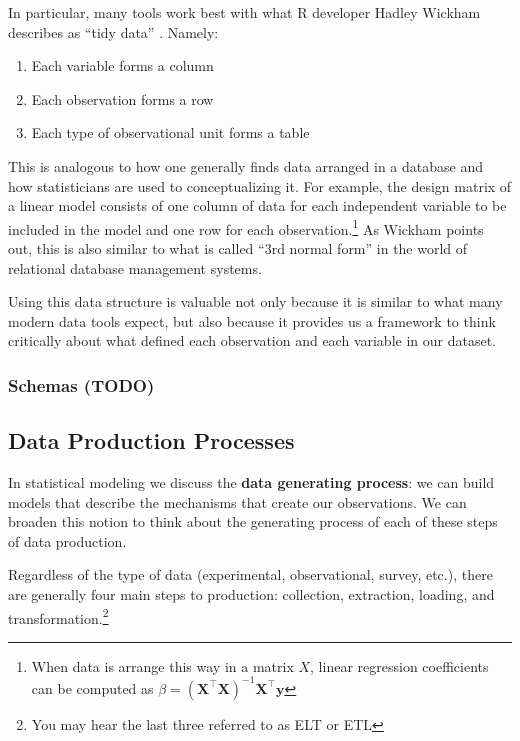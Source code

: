 \documentclass[
]{krantz}
\providecommand{\tightlist}{%
  \setlength{\itemsep}{0pt}\setlength{\parskip}{0pt}}
\begin{document}
In particular, many tools work best with what R developer Hadley Wickham describes as ``tidy data'' \citep{wickham_tidy}. Namely:

\begin{enumerate}
\def\labelenumi{\arabic{enumi}.}
\tightlist
\item
  Each variable forms a column
\item
  Each observation forms a row
\item
  Each type of observational unit forms a table
\end{enumerate}

This is analogous to how one generally finds data arranged in a database and how statisticians are used to conceptualizing it.
For example, the design matrix of a linear model consists of one column of data for each independent variable to be included in the model and one row for each observation.\footnote{When data is arrange this way in a matrix \(X\), linear regression coefficients can be computed as \(\beta = (\mathbf{X}^\intercal\mathbf{X})^{-1}\mathbf{X}^\intercal \mathbf{y}\)}
As Wickham points out, this is also similar to what is called ``3rd normal form'' in the world of relational database management systems.

Using this data structure is valuable not only because it is similar to what many modern data tools expect, but also because it provides us a framework to think critically about what defined each observation and each variable in our dataset.

\hypertarget{schemas-todo}{%
\subsubsection{Schemas (TODO)}\label{schemas-todo}}

\hypertarget{data-production-processes}{%
\subsection{Data Production Processes}\label{data-production-processes}}

In statistical modeling we discuss the \textbf{data generating process}: we can build models that describe the mechanisms that create our observations.
We can broaden this notion to think about the generating process of each of these steps of data production.

Regardless of the type of data (experimental, observational, survey, etc.), there are generally four main steps to production: collection, extraction, loading, and transformation.\footnote{You may hear the last three referred to as ELT or ETL}
\end{document}
